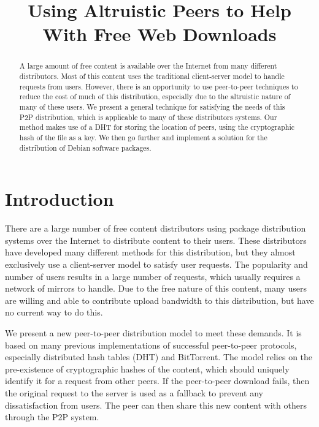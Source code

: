 \documentclass[conference]{IEEEtran}
\begin{document}
\title{Using Altruistic Peers to Help With Free Web Downloads}
\author{
}

\maketitle

\begin{abstract}
A large amount of free content is available over the Internet from
many different distributors. Most of this content uses the traditional
client-server model to handle requests from users. However, there is an
opportunity to use peer-to-peer techniques to reduce the cost of
much of this distribution, especially due to the altruistic nature
of many of these users. We present a general technique for
satisfying the needs of this P2P distribution, which is applicable
to many of these distributors systems. Our method makes use of a DHT
for storing the location of peers, using the cryptographic hash of
the file as a key. We then go further and implement a solution for
the distribution of Debian software packages.
\end{abstract}


\section{Introduction}
\label{intro}

There are a large number of free content distributors using
package distribution systems over the Internet to distribute content
to their users. These distributors have developed many different
methods for this distribution, but they almost exclusively use a client-server
model to satisfy user requests. The popularity and number of users
results in a large number of requests, which usually requires a
network of mirrors to handle. Due to the free nature of this
content, many users are willing and able to contribute upload
bandwidth to this distribution, but have no current way to do this.

We present a new peer-to-peer distribution model to meet these
demands. It is based on many previous implementations of successful
peer-to-peer protocols, especially distributed hash tables (DHT) and
BitTorrent. The model relies on the pre-existence of cryptographic
hashes of the content, which should uniquely identify it for a
request from other peers. If the peer-to-peer download fails, then
the original request to the server is used as a fallback to prevent
any dissatisfaction from users. The peer can then share this new
content with others through the P2P system.
\end{document}

